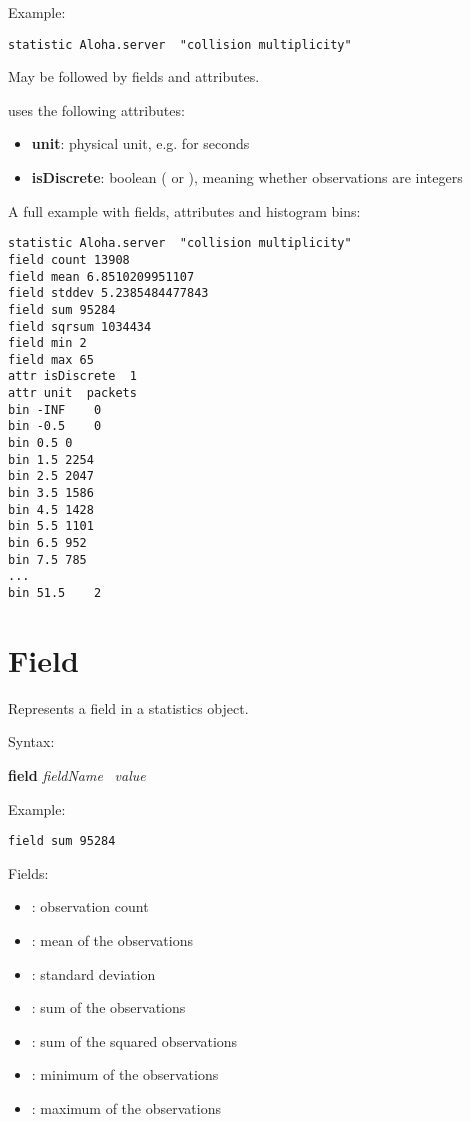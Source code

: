 Example:

\begin{verbatim}
statistic Aloha.server 	"collision multiplicity"
\end{verbatim}

May be followed by fields and attributes.

\opp uses the following attributes:

\begin{itemize}
    \item \textbf{unit}: physical unit, e.g.  for seconds
    \item \textbf{isDiscrete}: boolean ( or ), meaning whether
          observations are integers
\end{itemize}

A full example with fields, attributes and histogram bins:

\begin{verbatim}
statistic Aloha.server 	"collision multiplicity"
field count 13908
field mean 6.8510209951107
field stddev 5.2385484477843
field sum 95284
field sqrsum 1034434
field min 2
field max 65
attr isDiscrete  1
attr unit  packets
bin	-INF	0
bin	-0.5	0
bin	0.5	0
bin	1.5	2254
bin	2.5	2047
bin	3.5	1586
bin	4.5	1428
bin	5.5	1101
bin	6.5	952
bin	7.5	785
...
bin	51.5	2
\end{verbatim}


\section{Field}

Represents a field in a statistics object.

Syntax:

\hspace{20mm} \textbf{field} \textit{fieldName} \ \textit{value}

Example:

\begin{verbatim}
field sum 95284
\end{verbatim}

Fields:

\begin{itemize}
    \item {}: observation count
    \item {}: mean of the observations
    \item {}: standard deviation
    \item {}: sum of the observations
    \item {}: sum of the squared observations
    \item {}: minimum of the observations
    \item {}: maximum of the observations
\end{itemize}

